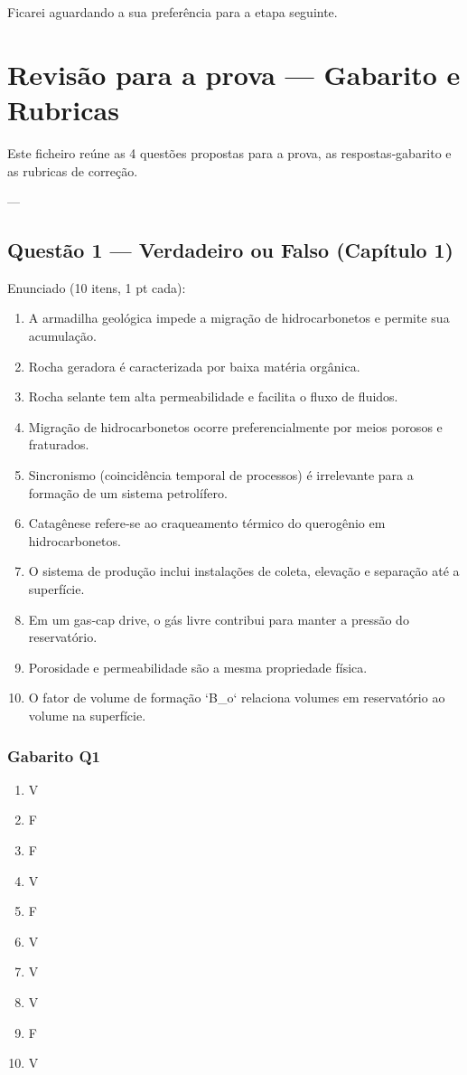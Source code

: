 \documentclass[11pt,a4paper]{article}
\begin{document}
Ficarei aguardando a sua preferência para a etapa seguinte.

\section{Revisão para a prova — Gabarito e Rubricas}

Este ficheiro reúne as 4 questões propostas para a prova, as respostas‑gabarito e as rubricas de correção.

---

\subsection{Questão 1 — Verdadeiro ou Falso (Capítulo 1)}

Enunciado (10 itens, 1 pt cada):
\begin{enumerate}
\item A armadilha geológica impede a migração de hidrocarbonetos e permite sua acumulação.
\item Rocha geradora é caracterizada por baixa matéria orgânica.
\item Rocha selante tem alta permeabilidade e facilita o fluxo de fluidos.
\item Migração de hidrocarbonetos ocorre preferencialmente por meios porosos e fraturados.
\item Sincronismo (coincidência temporal de processos) é irrelevante para a formação de um sistema petrolífero.
\item Catagênese refere‑se ao craqueamento térmico do querogênio em hidrocarbonetos.
\item O sistema de produção inclui instalações de coleta, elevação e separação até a superfície.
\item Em um gas‑cap drive, o gás livre contribui para manter a pressão do reservatório.
\item Porosidade e permeabilidade são a mesma propriedade física.
\item O fator de volume de formação `B_o` relaciona volumes em reservatório ao volume na superfície.
\end{enumerate}

\subsubsection{Gabarito Q1}
\begin{enumerate}
\item V
\item F
\item F
\item V
\item F
\item V
\item V
\item V
\item F
\item V
\end{enumerate}
\end{document}
